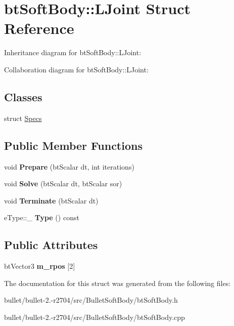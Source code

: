 \hypertarget{structbt_soft_body_1_1_l_joint}{\section{bt\+Soft\+Body\+:\+:L\+Joint Struct Reference}
\label{structbt_soft_body_1_1_l_joint}
}


Inheritance diagram for bt\+Soft\+Body\+:\+:L\+Joint\+:


Collaboration diagram for bt\+Soft\+Body\+:\+:L\+Joint\+:
\subsection*{Classes}
\begin{DoxyCompactItemize}
\item 
struct \hyperlink{structbt_soft_body_1_1_l_joint_1_1_specs}{Specs}
\end{DoxyCompactItemize}
\subsection*{Public Member Functions}
\begin{DoxyCompactItemize}
\item 
\hypertarget{structbt_soft_body_1_1_l_joint_aafb676d1a943fbce147eb4d8cf4c6a67}{void {\bfseries Prepare} (bt\+Scalar dt, int iterations)}\label{structbt_soft_body_1_1_l_joint_aafb676d1a943fbce147eb4d8cf4c6a67}

\item 
\hypertarget{structbt_soft_body_1_1_l_joint_a641a7b24103aa03e5e3fb8eac339a592}{void {\bfseries Solve} (bt\+Scalar dt, bt\+Scalar sor)}\label{structbt_soft_body_1_1_l_joint_a641a7b24103aa03e5e3fb8eac339a592}

\item 
\hypertarget{structbt_soft_body_1_1_l_joint_adbcf5b43c02ca4455e1731474aa823dc}{void {\bfseries Terminate} (bt\+Scalar dt)}\label{structbt_soft_body_1_1_l_joint_adbcf5b43c02ca4455e1731474aa823dc}

\item 
\hypertarget{structbt_soft_body_1_1_l_joint_a568e2b9bd138275d0dac578ad86c7374}{e\+Type\+::\+\_\+ {\bfseries Type} () const }\label{structbt_soft_body_1_1_l_joint_a568e2b9bd138275d0dac578ad86c7374}

\end{DoxyCompactItemize}
\subsection*{Public Attributes}
\begin{DoxyCompactItemize}
\item 
\hypertarget{structbt_soft_body_1_1_l_joint_a6b2a42269b6e1e439a834fa7d5491d11}{bt\+Vector3 {\bfseries m\+\_\+rpos} \mbox{[}2\mbox{]}}\label{structbt_soft_body_1_1_l_joint_a6b2a42269b6e1e439a834fa7d5491d11}

\end{DoxyCompactItemize}


The documentation for this struct was generated from the following files\+:\begin{DoxyCompactItemize}
\item 
bullet/bullet-\/2.-\/r2704/src/\+Bullet\+Soft\+Body/bt\+Soft\+Body.\+h\item 
bullet/bullet-\/2.-\/r2704/src/\+Bullet\+Soft\+Body/bt\+Soft\+Body.\+cpp\end{DoxyCompactItemize}
